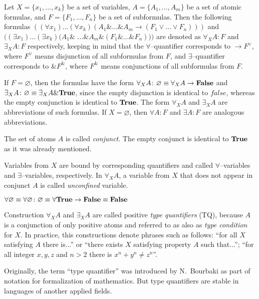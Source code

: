 \documentclass[a4paper,12pt]{article}
\begin{document}
Let $X = \{x_1,\ldots,x_k\}$ be a set of variables, $A = \{A_1,\ldots,A_m\}$ be a set of atomic formulas, and $F = \{F_1,\ldots,F_n\}$ be a set of subformulas. Then the following formulas $((\forall x_1) \ldots (\forall x_k) (A_1 \& \ldots \& A_m \rightarrow (F_1 \vee \ldots \vee F_n)))$ and $((\exists x_1) \ldots (\exists x_k) (A_1 \&$ $\ldots \& A_m \& (F_1 \& \ldots \& F_n)))$ are denoted as  $\forall_XA\colon F$ and $\exists_XA\colon F$ respectively, keeping in mind that the $\forall$--quantifier corresponds to $\rightarrow F^{\vee}$, where $F^{\vee}$ means disjunction of all subformulas from $F$, and $\exists$--quantifier corresponds to $\& F^{\&}$, where $F^{\&}$ means conjunctions of all subformulas from $F$.

If $F = \varnothing$, then the formulas have the form $\forall_XA\colon\varnothing \equiv \forall_XA \rightarrow \text{\textbf{False}}$ and $\exists_XA\colon\varnothing \equiv \exists_XA \& \text{\textbf{True}}$, since the empty disjunction is identical to $false$, whereas the empty conjunction is identical to $\text{\textbf{True}}$.  The form $\forall_XA$ and $\exists_XA$ are abbreviations of such formulas.  If $X = \varnothing$, then $\forall A\colon F$ and $\exists A\colon F$ are analogous abbreviations.

The set of atoms $A$ is called {\em conjunct}. The empty conjunct is identical to $\text{\textbf{True}}$ as it was already mentioned.

Variables from $X$ are bound by corresponding quantifiers and called $\forall$--variables and $\exists$--variables, respectively. In $\forall_XA$, a variable from $X$ that does not appear in conjunct $A$ is called {\em unconfined} variable.

$\forall \varnothing \equiv \forall \varnothing\colon\varnothing \equiv \forall \text{\textbf{True}} \rightarrow \text{\textbf{False}} \equiv \text{\textbf{False}}$

Construction $\forall_XA$ and $\exists_XA$ are called positive \emph{type quantifiers} (TQ), because $A$ is a conjunction of only positive atoms and referred to as also as \emph{type condition} for $X$. In practice, this constructions denote phrases such as follows: ``for all $X$ satisfying $A$ there is...'' or ``there exists $X$ satisfying property $A$ such that...''; ``for all integer $x,y,z$ and $n>2$ there is $x^n + y^n \ne z^n$''.

Originally, the term ``type quantifier'' was introduced by N.~Bourbaki \cite{Bourbaki} as part of notation for formalization of mathematics. But type quantifiers are stable in languages of another applied fields.
\end{document}
